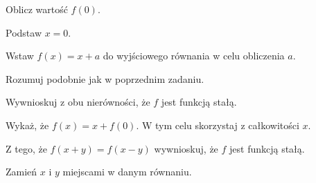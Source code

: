 

\begin{hints_list}
	\item *
	\item Oblicz wartość $f(0)$.
	\item Podstaw $x = 0$.
	\item *
	\item Wstaw $f(x) = x + a$ do wyjściowego równania w celu obliczenia $a$.
	\item Rozumuj podobnie jak w poprzednim zadaniu.
	\item Wywnioskuj z obu nierówności, że $f$ jest funkcją stałą.
	\item Wykaż, że $f(x) = x + f(0)$. W tym celu skorzystaj z całkowitości $x$.
	\item Z tego, że $f(x + y) = f(x - y)$ wywnioskuj, że $f$ jest funkcją stałą.
	\item Zamień $x$ i $y$ miejscami w danym równaniu.
\end{hints_list}